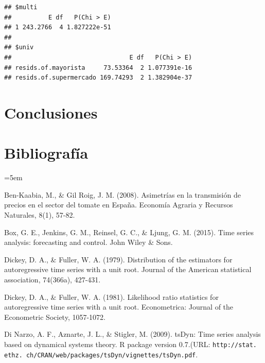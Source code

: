 \documentclass[12pt, twoside]{book}\usepackage[]{graphicx}\usepackage[]{color}
\makeatletter
\newenvironment{kframe}{%
 \def\at@end@of@kframe{}%
 \ifinner\ifhmode%
  \def\at@end@of@kframe{\end{minipage}}%
  \begin{minipage}{\columnwidth}%
 \fi\fi%
 \def\FrameCommand##1{\hskip\@totalleftmargin \hskip-\fboxsep
 \colorbox{shadecolor}{##1}\hskip-\fboxsep
     \hskip-\linewidth \hskip-\@totalleftmargin \hskip\columnwidth}%
 \MakeFramed {\advance\hsize-\width
   \@totalleftmargin\z@ \linewidth\hsize
   \@setminipage}}%
 {\par\unskip\endMakeFramed%
 \at@end@of@kframe}
\newenvironment{knitrout}{}{} %
\numberwithin{equation}{section}
\numberwithin{theorem}{section}
\numberwithin{teorema}{section}
\numberwithin{defi}{section}
\numberwithin{prop}{section}
\numberwithin{defi}{section}
\theoremstyle{plain}
\makeatother
\begin{document}
\begin{knitrout}
\color{fgcolor}\begin{kframe}


{\ttfamily\noindent\bfseries\color{errorcolor}{\#\# Error in residuals(mono\_rest): objeto 'mono\_rest' no encontrado}}\begin{verbatim}
## $multi
##          E df   P(Chi > E)
## 1 243.2766  4 1.827222e-51
## 
## $univ
##                                E df   P(Chi > E)
## resids.of.mayorista     73.53364  2 1.077391e-16
## resids.of.supermercado 169.74293  2 1.382904e-37
\end{verbatim}


{\ttfamily\noindent\bfseries\color{errorcolor}{\#\# Error in residuals(mono\_rest): objeto 'mono\_rest' no encontrado}}

{\ttfamily\noindent\bfseries\color{errorcolor}{\#\# Error in residuals(mono\_rest): objeto 'mono\_rest' no encontrado}}\end{kframe}
\end{knitrout}


\chapter{Conclusiones}
\chapter{Bibliografía}

\hangindent=5em

Ben-Kaabia, M., \& Gil Roig, J. M. (2008). Asimetrías en la transmisión de precios en el sector del tomate en España. Economía Agraria y Recursos Naturales, 8(1), 57-82.

Box, G. E., Jenkins, G. M., Reinsel, G. C., \& Ljung, G. M. (2015). Time series analysis: forecasting and control. John Wiley \& Sons.

Dickey, D. A., \& Fuller, W. A. (1979). Distribution of the estimators for autoregressive time series with a unit root. Journal of the American statistical association, 74(366a), 427-431.

Dickey, D. A., \& Fuller, W. A. (1981). Likelihood ratio statistics for autoregressive time series with a unit root. Econometrica: Journal of the Econometric Society, 1057-1072.

Di Narzo, A. F., Aznarte, J. L., \& Stigler, M. (2009). tsDyn: Time series analysis based on dynamical systems theory. R package version 0.7.(URL: \texttt{http://stat. ethz. ch/CRAN/web/packages/tsDyn/vignettes/tsDyn.pdf}.
\end{document}
